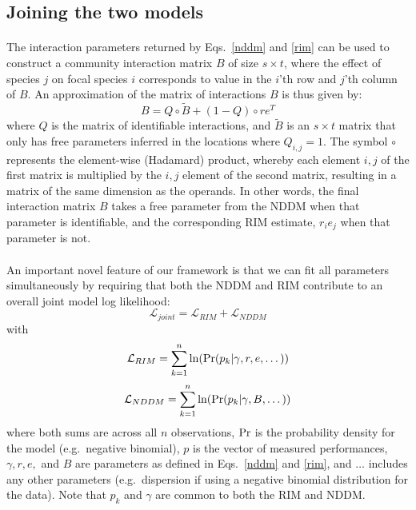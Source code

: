 \documentclass[a4,12pt]{article}
\begin{document}
\begin{refsection}
    \subsection{Joining the two models}
    \label{meth:addlog}

    \paragraph{}
    The interaction parameters returned by Eqs.~\ref{nddm} and \ref{rim} can be used to construct a community interaction matrix $B$ of size $s \times t$, where the effect of species $j$ on focal species $i$ corresponds to value in the $i$'th row and $j$'th column of $B$. An approximation of the matrix of interactions $B$ is thus given by:
        \begin{equation}
        B = Q \circ \tilde B + (1 - Q) \circ r e^T
        \label{matB}
        \end{equation}
    where $Q$ is the matrix of identifiable interactions, and $\tilde B$ is an $s \times t$ matrix that only has free parameters inferred in the locations where $Q_{i, j} =1$. The symbol $\circ$ represents the element-wise (Hadamard) product, whereby each element $i, j$ of the first matrix is multiplied by the $i, j$ element of the second matrix, resulting in a matrix of the same dimension as the operands. In other words, the final interaction matrix $B$ takes a free parameter from the NDDM when that parameter is identifiable, and the corresponding RIM estimate, $r_i e_j$ when that parameter is not.

    \paragraph{}
    An important novel feature of our framework is that we can fit all parameters simultaneously by requiring that both the NDDM and RIM contribute to an overall joint model log likelihood:
         \begin{equation}
        \mathcal{L}_{joint} = \mathcal{L}_{RIM} + \mathcal{L}_{NDDM}
        \label{loglikjoint}
        \end{equation}
    with
        \begin{equation}
        \mathcal{L}_{RIM} = \sum_{k=1}^{n} \ln ({\rm Pr} (p_k | \gamma, r, e, \dots))
        \label{logrim}
        \end{equation}
        \begin{equation}
        \mathcal{L}_{NDDM} = \sum_{k=1}^{n} \ln ({\rm Pr} (p_k | \gamma, B, \dots))
        \label{lognddm}
        \end{equation}
    where both sums are across all $n$ observations, ${\rm Pr}$ is the probability density for the model (e.g.\ negative binomial), $p$ is the vector of measured performances, $\gamma, r, e,$ and $B$ are parameters as defined in Eqs.~\ref{nddm} and \ref{rim}, and $\dots$ includes any other parameters (e.g.\ dispersion if using a negative binomial distribution for the data). Note that $p_k$ and $\gamma$ are common to both the RIM and NDDM.


\end{refsection}
\end{document}
